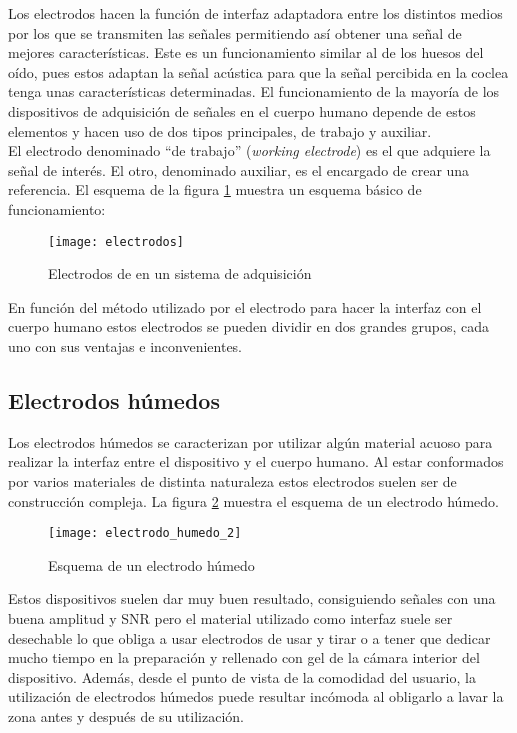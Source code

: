 Los electrodos hacen la función de interfaz adaptadora entre los distintos medios por los que se transmiten las señales permitiendo así obtener una señal de mejores características. Este es un funcionamiento similar al de los huesos del oído, pues estos adaptan la señal acústica para que la señal percibida en la coclea tenga unas características determinadas. El funcionamiento de la mayoría de los dispositivos de adquisición de señales en el cuerpo humano depende de estos elementos y hacen uso de dos tipos principales, de trabajo y auxiliar.
\\El electrodo denominado ``de trabajo'' (\textit{working electrode}) es el que adquiere la señal de interés. El otro, denominado auxiliar, es el encargado de crear una referencia. El esquema de la figura \ref{fig:electrodos} muestra un esquema básico de funcionamiento:

\begin{figure} [h]
    \centering
    \texttt{[image: electrodos]}
    \caption{Electrodos de en un sistema de adquisición \cite{apuntes}}
    \label{fig:electrodos}
\end{figure}

En función del método utilizado por el electrodo para hacer la interfaz con el cuerpo humano estos electrodos se pueden dividir en dos grandes grupos, cada uno con sus ventajas e inconvenientes. 

\subsection{Electrodos húmedos\label{sec:Elec_humedos}}

Los electrodos húmedos se caracterizan por utilizar algún material acuoso para realizar la interfaz entre el dispositivo y el cuerpo humano. Al estar conformados por varios materiales de distinta naturaleza estos electrodos suelen ser de construcción compleja. La figura \ref{fig:electrodo_humedo_2} muestra el esquema de un electrodo húmedo.

\begin{figure} [H]
    \centering
    \texttt{[image: electrodo\_humedo\_2]}
    \caption{Esquema de un electrodo húmedo \cite{apuntes}}
    \label{fig:electrodo_humedo_2}
\end{figure}

Estos dispositivos suelen dar muy buen resultado, consiguiendo señales con una buena amplitud y \acrshort{SNR} pero el material utilizado como interfaz suele ser desechable lo que obliga a usar electrodos de usar y tirar o a tener que dedicar mucho tiempo en la preparación y rellenado con gel de la cámara interior del dispositivo. Además, desde el punto de vista de la comodidad del usuario, la utilización de electrodos húmedos puede resultar incómoda al obligarlo a lavar la zona antes y después de su utilización.

